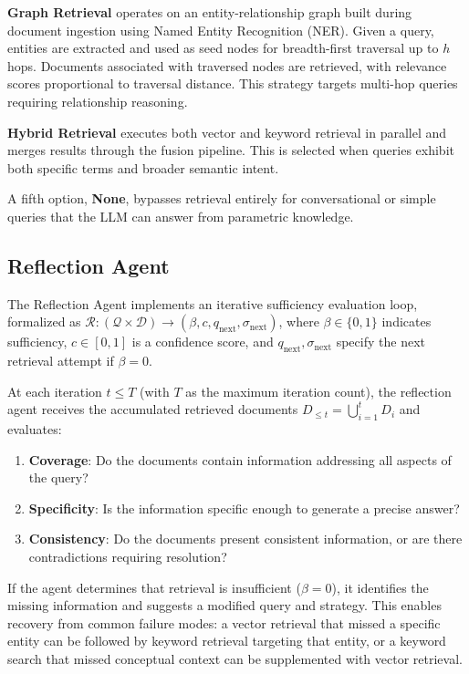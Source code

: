 \documentclass[runningheads]{llncs}
\begin{document}
\textbf{Graph Retrieval} operates on an entity-relationship graph built during document ingestion using Named Entity Recognition (NER). Given a query, entities are extracted and used as seed nodes for breadth-first traversal up to $h$ hops. Documents associated with traversed nodes are retrieved, with relevance scores proportional to traversal distance. This strategy targets multi-hop queries requiring relationship reasoning.

\textbf{Hybrid Retrieval} executes both vector and keyword retrieval in parallel and merges results through the fusion pipeline. This is selected when queries exhibit both specific terms and broader semantic intent.

A fifth option, \textbf{None}, bypasses retrieval entirely for conversational or simple queries that the LLM can answer from parametric knowledge.

\subsection{Reflection Agent}

The Reflection Agent implements an iterative sufficiency evaluation loop, formalized as $\mathcal{R}: (\mathcal{Q} \times \mathcal{D}) \rightarrow (\beta, c, q_{\text{next}}, \sigma_{\text{next}})$, where $\beta \in \{0, 1\}$ indicates sufficiency, $c \in [0, 1]$ is a confidence score, and $q_{\text{next}}, \sigma_{\text{next}}$ specify the next retrieval attempt if $\beta = 0$.

At each iteration $t \leq T$ (with $T$ as the maximum iteration count), the reflection agent receives the accumulated retrieved documents $D_{\leq t} = \bigcup_{i=1}^{t} D_i$ and evaluates:

\begin{enumerate}
    \item \textbf{Coverage}: Do the documents contain information addressing all aspects of the query?
    \item \textbf{Specificity}: Is the information specific enough to generate a precise answer?
    \item \textbf{Consistency}: Do the documents present consistent information, or are there contradictions requiring resolution?
\end{enumerate}

If the agent determines that retrieval is insufficient ($\beta = 0$), it identifies the missing information and suggests a modified query and strategy. This enables recovery from common failure modes: a vector retrieval that missed a specific entity can be followed by keyword retrieval targeting that entity, or a keyword search that missed conceptual context can be supplemented with vector retrieval.
\end{document}
